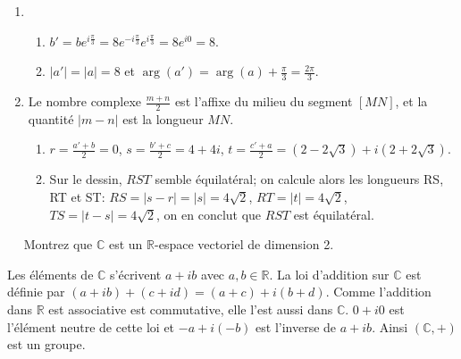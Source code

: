 \documentclass[a4paper,12pt]{exam}
\begin{document}
\begin{questions}
\begin{solution}
\begin{enumerate}
\begin{enumerate}
\begin{center}
        \end{center}
 \end{enumerate}
\item\ 
\begin{enumerate}
 \item $b'=be^{i\frac\pi3}=8e^{-i\frac\pi3}e^{i\frac\pi3}=8e^{i0}=8$.
 \item $|a'|=|a|=8$ et $\arg(a')=\arg(a)+\frac\pi3=\frac{2\pi}3$.
\end{enumerate}
\item Le nombre complexe $\tfrac{m+n}2$ est l'affixe du milieu du segment $[MN]$, et la quantité $|m-n|$ est la longueur $MN$.
\begin{enumerate}
 \item $r=\tfrac{a'+b}2=0$, $s=\tfrac{b'+c}2=4+4i$, $t=\tfrac{c'+a}2=(2-2\sqrt3)+i(2+2\sqrt3)$.
\item Sur le dessin, $RST$ semble équilatéral; on calcule alors les longueurs RS, RT et ST: $RS=|s-r|=|s|=4\sqrt2$, $RT=|t|=4\sqrt2$, $TS=|t-s|=4\sqrt2$, on en conclut que $RST$ est équilatéral.
\end{enumerate}
\end{enumerate}
\end{solution}

\ \vfill
\question\ 
 Montrez que $\mathbb C$ est un $\mathbb R$-espace vectoriel de dimension 2.
\begin{solution}
 Les éléments de $\mathbb C$ s'écrivent $a+ib$ avec $a,b\in\mathbb R$. La loi d'addition sur $\mathbb C$ est définie par $(a+ib)+(c+id)=(a+c)+i(b+d)$. Comme l'addition dans $\mathbb R$ est associative est commutative, elle l'est aussi dans $\mathbb C$. $0+i0$ est l'élément neutre de cette loi et $-a+i(-b)$ est l'inverse de $a+ib$. Ainsi $(\mathbb C,+)$ est un groupe.
 

\end{solution}
\end{questions}
\end{document}
